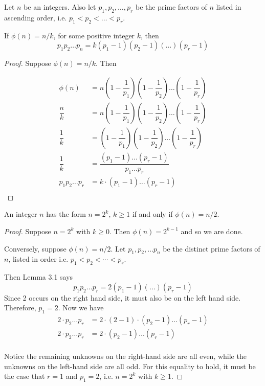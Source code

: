 \begin{lemma}
    Let $n$ be an integers. Also let $p_1, p_2, \ldots, p_r$ be the prime
    factors of $n$ listed in ascending order, i.e. $p_1 < p_2 < \ldots < p_r$.
    
    If $\phi(n) = n/k$, for some positive integer $k$, then
    \[p_1 p_2 \ldots p_n = k(p_1 - 1)(p_2 - 1)(\ldots)(p_r - 1) \]
\end{lemma}
\begin{proof}
    Suppose $\phi(n) = n/k$. Then

    \begin{align*}
        \phi(n) &= n \left( 1 - \dfrac{1}{p_1} \right) \left( 1 - \dfrac{1}{p_2} \right) \dots \left( 1 - \dfrac{1}{p_r} \right) \\
        \dfrac{n}{k} &= n \left( 1 - \dfrac{1}{p_1} \right) \left( 1 - \dfrac{1}{p_2} \right) \dots \left( 1 - \dfrac{1}{p_r} \right) \\
        \dfrac{1}{k} &= \left( 1 - \dfrac{1}{p_1} \right) \left( 1 - \dfrac{1}{p_2} \right) \dots \left( 1 - \dfrac{1}{p_r} \right) \\
        \dfrac{1}{k} &= \dfrac{(p_1 - 1) \dots (p_r - 1)}{p_1 \dots p_r} \\
        p_1 p_2 \dots p_r &= k \cdot (p_1 - 1) \dots (p_r - 1) \\
    \end{align*}
\end{proof}

\begin{prop}[11.12a]
    An integer $n$ has the form $n=2^k$, $k \geq 1$ if and only if 
    $\phi(n) = n/2$.
\end{prop}
\begin{proof}
    Suppose $n=2^k$ with $k \geq 0$. Then $\phi(n) = 2^{k-1}$ and so we are
    done.
    
    Conversely, suppose $\phi(n)=n/2$. Let $p_1, p_2, \dots p_n$ be the distinct
    prime factors of $n$, listed in order i.e. $p_1 < p_2 < \cdots < p_r$.
    
    Then Lemma 3.1 says
    \[ p_1 p_2 \ldots p_r = 2 (p_1 - 1)(\ldots)(p_r - 1) \]
    Since 2 occurs on the right hand side, it must also be on the left hand
    side. Therefore, $p_1 = 2$. Now we have
    \begin{align*}
    2 \cdot p_2 \dots p_r &= 2 \cdot (2 - 1) \cdot (p_2 - 1) \dots (p_r - 1) \\
    2 \cdot p_2 \dots p_r &= 2 \cdot (p_2 - 1) \dots (p_r - 1) \\
    \end{align*}
    
    Notice the remaining unknowns on the right-hand side are all even, while
    the unknowns on the left-hand side are all odd. For this equality to hold,
    it must be the case that $r=1$ and $p_1 = 2$, i.e. $n=2^k$ with $k \geq 1$.
\end{proof}


